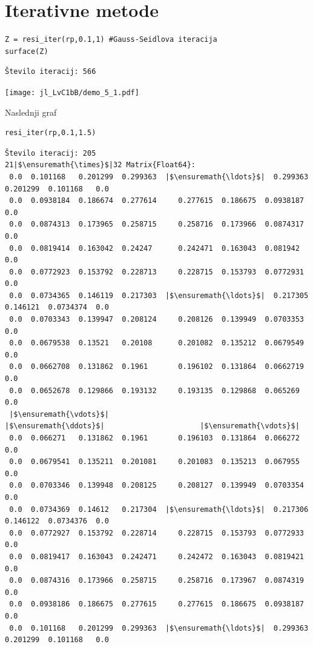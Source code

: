 \documentclass[12pt,a4paper]{article}
\begin{document}
\section{Iterativne metode}

\begin{verbatim}
Z = resi_iter(rp,0.1,1) #Gauss-Seidlova iteracija
surface(Z)
\end{verbatim}
\begin{verbatim}
Število iteracij: 566
\end{verbatim}
\texttt{[image: jl\_LvC1bB/demo\_5\_1.pdf]}

Naslednji graf


\begin{verbatim}
resi_iter(rp,0.1,1.5)
\end{verbatim}
\begin{verbatim}
Število iteracij: 205
21|$\ensuremath{\times}$|32 Matrix{Float64}:
 0.0  0.101168   0.201299  0.299363  |$\ensuremath{\ldots}$|  0.299363  0.201299  0.101168   0.0
 0.0  0.0938184  0.186674  0.277614     0.277615  0.186675  0.0938187  0.0
 0.0  0.0874313  0.173965  0.258715     0.258716  0.173966  0.0874317  0.0
 0.0  0.0819414  0.163042  0.24247      0.242471  0.163043  0.081942   0.0
 0.0  0.0772923  0.153792  0.228713     0.228715  0.153793  0.0772931  0.0
 0.0  0.0734365  0.146119  0.217303  |$\ensuremath{\ldots}$|  0.217305  0.146121  0.0734374  0.0
 0.0  0.0703343  0.139947  0.208124     0.208126  0.139949  0.0703353  0.0
 0.0  0.0679538  0.13521   0.20108      0.201082  0.135212  0.0679549  0.0
 0.0  0.0662708  0.131862  0.1961       0.196102  0.131864  0.0662719  0.0
 0.0  0.0652678  0.129866  0.193132     0.193135  0.129868  0.065269   0.0
 |$\ensuremath{\vdots}$|                                   |$\ensuremath{\ddots}$|                      |$\ensuremath{\vdots}$|          
 0.0  0.066271   0.131862  0.1961       0.196103  0.131864  0.066272   0.0
 0.0  0.0679541  0.135211  0.201081     0.201083  0.135213  0.067955   0.0
 0.0  0.0703346  0.139948  0.208125     0.208127  0.139949  0.0703354  0.0
 0.0  0.0734369  0.14612   0.217304  |$\ensuremath{\ldots}$|  0.217306  0.146122  0.0734376  0.0
 0.0  0.0772927  0.153792  0.228714     0.228715  0.153793  0.0772933  0.0
 0.0  0.0819417  0.163043  0.242471     0.242472  0.163043  0.0819421  0.0
 0.0  0.0874316  0.173966  0.258715     0.258716  0.173967  0.0874319  0.0
 0.0  0.0938186  0.186675  0.277615     0.277615  0.186675  0.0938187  0.0
 0.0  0.101168   0.201299  0.299363  |$\ensuremath{\ldots}$|  0.299363  0.201299  0.101168   0.0
\end{verbatim}
\end{document}
